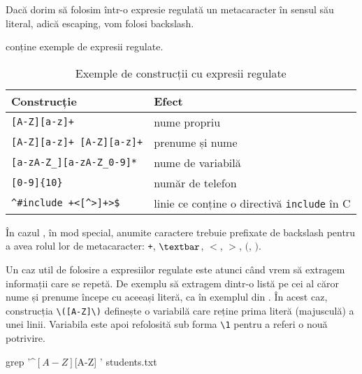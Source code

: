 Dacă dorim să folosim într-o expresie regulată un metacaracter în sensul său literal, adică escaping, vom folosi backslash.

 conține exemple de expresii regulate.

\begin{table}[!htb]
  \begin{center}
    \begin{tabular}{ p{} p{} }
      \toprule
        \textbf{Construcție} &
        \textbf{Efect} \\
      \midrule
        \verb|[A-Z][a-z]+| &
        nume propriu \\

        \verb|[A-Z][a-z]+ [A-Z][a-z]+| &
        prenume și nume \\

        \verb|[a-zA-Z_][a-zA-Z_0-9]*| &
        nume de variabilă \\

        \verb|[0-9]{10}| &
        număr de telefon \\

        \verb|^#include +<[^>]+>$| &
        linie ce conține o directivă \texttt{include} în C \\

      \bottomrule
    \end{tabular}
  \end{center}
  \caption{Exemple de construcții cu expresii regulate}
  \label{tab:cli:regex-example}
\end{table}

În cazul , în mod special, anumite caractere trebuie prefixate de backslash
pentru a avea rolul lor de metacaracter: \texttt{+}, \texttt{$\textbar$}, \texttt{$<$}, \texttt{$>$}, \texttt{$($}, \texttt{$)$}.

Un caz util de folosire a expresiilor regulate este atunci când vrem să extragem
informații care se repetă. De exemplu să extragem dintr-o listă pe cei al căror
nume și prenume începe cu aceeași literă, ca în exemplul din . În acest caz, construcția \verb|\([A-Z]\)| definește o variabilă care reține prima literă (majusculă) a unei linii. Variabila este apoi refolosită sub forma \verb|\1| pentru a referi o nouă potrivire.

\begin{screen}[caption={Expresii regulate cu variabile},escapechar=,label={lst:cli:regex-var}]
grep '^\([A-Z]\)[A-Z]\+ \1' students.txt
\end{screen}


